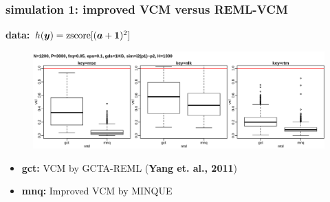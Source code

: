 \documentclass{beamer}
\begin{document}
\begin{frame}\frametitle{simulation 1: improved VCM versus REML-VCM}
  \textbf{data: $h({\bm{y}})=\text{zscore}[({\bm{a}} + \mathbf{1})^2]$} \\
  \begin{figure}
    \centering \includegraphics[width=.95\linewidth]{img/1kg_whl_p02}
  \end{figure}
  \textbf{\color{blue}{inner plot: strategies, from left to right:}}
  \begin{itemize}
  \item \textbf{gct:} VCM by GCTA-REML (\textbf{Yang et. al., 2011})
  \item \textbf{mnq:} Improved VCM by MINQUE
  \end{itemize}
\end{frame}
\end{document}
